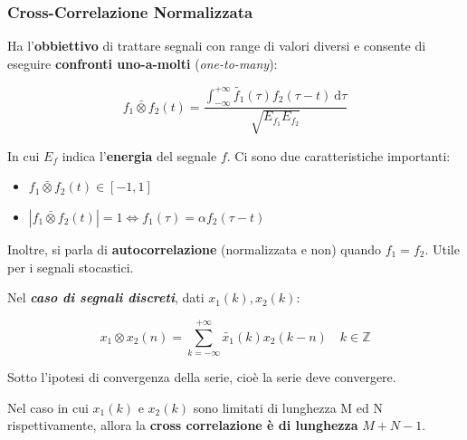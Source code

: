 \documentclass[a4paper]{article}
\begin{document}
	\newpage
	
	\subsubsection{Cross-Correlazione Normalizzata}
	
	Ha l'\textbf{obbiettivo} di trattare segnali con range di valori diversi e consente di eseguire \textbf{confronti uno-a-molti} (\emph{one-to-many}):
	
	\begin{equation*}
		f_{1} \bar{\otimes} f_{2}\left(t\right) = \dfrac{\displaystyle \int_{-\infty}^{+\infty} \tilde{f_{1}}\left(\tau\right) f_{2}\left(\tau - t\right) \: \mathrm{d}\tau}{\displaystyle \sqrt{E_{f_{1}} E_{f_{2}}}}
	\end{equation*}
	
	\noindent
	In cui $E_{f}$ indica l'\textbf{energia} del segnale $f$. Ci sono due caratteristiche importanti:
	
	\begin{itemize}
		\item $f_{1} \bar{\otimes} f_{2}\left(t\right) \in \left[-1, 1\right]$
		
		\item $\left|f_{1} \bar{\otimes} f_{2}\left(t\right)\right| = 1 \iff f_{1}\left(\tau\right) = \alpha f_{2} \left(\tau - t\right)$
	\end{itemize}
	
	\noindent
	Inoltre, si parla di \textbf{autocorrelazione} (normalizzata e non) quando $f_{1} = f_{2}$. Utile per i segnali stocastici.\newline
	
	\noindent
	Nel \textbf{\emph{caso di segnali discreti}}, dati $x_{1}\left(k\right), x_{2}\left(k\right)$:
	
	\begin{equation*}
		x_{1} \otimes x_{2}\left(n\right) = \sum_{k = -\infty}^{+\infty} \tilde{x_{1}}\left(k\right) x_{2} \left(k - n\right) \hspace{1em} k \in \mathbb{Z}
	\end{equation*}

	\noindent
	Sotto l'ipotesi di convergenza della serie, cioè la serie deve convergere.\newline
	
	\noindent
	Nel caso in cui $x_{1}\left(k\right)$ e $x_{2}\left(k\right)$ sono limitati di lunghezza M ed N rispettivamente, allora la \textbf{cross correlazione è di lunghezza} $M+N-1$.
	
\end{document}
